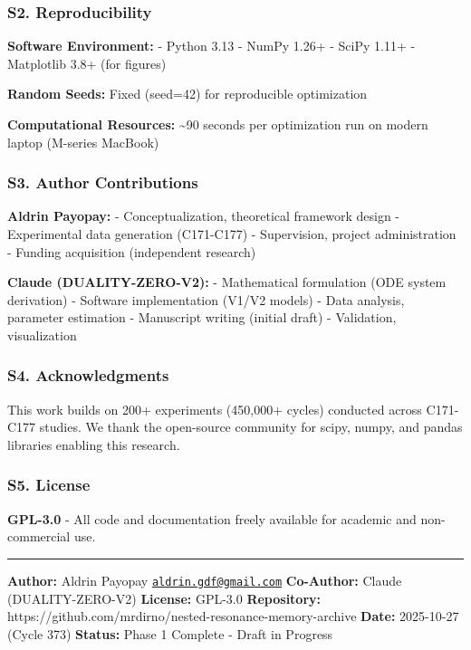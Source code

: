 \documentclass[
]{article}
\begin{document}
\subsubsection{S2. Reproducibility}\label{s2.-reproducibility}

\textbf{Software Environment:} - Python 3.13 - NumPy 1.26+ - SciPy 1.11+
- Matplotlib 3.8+ (for figures)

\textbf{Random Seeds:} Fixed (seed=42) for reproducible optimization

\textbf{Computational Resources:} \textasciitilde90 seconds per
optimization run on modern laptop (M-series MacBook)

\subsubsection{S3. Author Contributions}\label{s3.-author-contributions}

\textbf{Aldrin Payopay:} - Conceptualization, theoretical framework
design - Experimental data generation (C171-C177) - Supervision, project
administration - Funding acquisition (independent research)

\textbf{Claude (DUALITY-ZERO-V2):} - Mathematical formulation (ODE
system derivation) - Software implementation (V1/V2 models) - Data
analysis, parameter estimation - Manuscript writing (initial draft) -
Validation, visualization

\subsubsection{S4. Acknowledgments}\label{s4.-acknowledgments}

This work builds on 200+ experiments (450,000+ cycles) conducted across
C171-C177 studies. We thank the open-source community for scipy, numpy,
and pandas libraries enabling this research.

\subsubsection{S5. License}\label{s5.-license}

\textbf{GPL-3.0} - All code and documentation freely available for
academic and non-commercial use.

\begin{center}\rule{0.5\linewidth}{0.5pt}\end{center}

\textbf{Author:} Aldrin Payopay
\href{mailto:aldrin.gdf@gmail.com}{\nolinkurl{aldrin.gdf@gmail.com}}
\textbf{Co-Author:} Claude (DUALITY-ZERO-V2) \textbf{License:} GPL-3.0
\textbf{Repository:}
https://github.com/mrdirno/nested-resonance-memory-archive
\textbf{Date:} 2025-10-27 (Cycle 373) \textbf{Status:} Phase 1 Complete
- Draft in Progress
\end{document}
